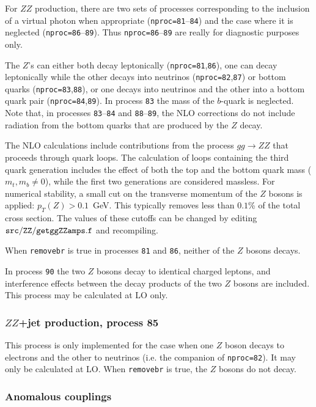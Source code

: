 \documentclass[12pt]{article}
\begin{document}
For $ZZ$ production, there are two sets of processes corresponding to the
inclusion of a virtual photon when appropriate ({\tt nproc=81}--{\tt 84})
and the case where it is neglected ({\tt nproc=86}--{\tt 89}).
Thus {\tt nproc=86}--{\tt 89} are really for diagnostic purposes only.

The $Z$'s can either both decay leptonically ({\tt nproc=81},{\tt 86}),
one can decay leptonically while the other decays into neutrinos
({\tt nproc=82},{\tt 87}) or bottom quarks ({\tt nproc=83},{\tt 88}), or
one decays into neutrinos and the other into a bottom quark pair
({\tt nproc=84},{\tt 89}).
In process {\tt 83} the mass of the $b$-quark is neglected. Note that, in processes
{\tt 83}--{\tt 84} and {\tt 88}--{\tt 89}, the NLO corrections do not include
radiation from the bottom quarks that are produced by the $Z$ decay.

The NLO calculations include contributions from the process $gg \to ZZ$
that proceeds through quark loops. The calculation of loops containing the third quark generation
includes the effect of both the top and the bottom quark mass ($m_t,m_b \neq 0$), while the first two
generations are considered massless. For numerical stability, a small cut on the
transverse momentum of the $Z$ bosons is applied: $p_T(Z)>0.1$~GeV.
This typically removes less than $0.1$\% of the total cross section. The
values of these cutoffs can be changed by editing ${\tt src/ZZ/getggZZamps.f}$ 
and recompiling.

When {\tt removebr} is true in processes {\tt 81} and {\tt 86},
neither of the $Z$ bosons decays.

In process {\tt 90} the two $Z$ bosons decay to identical charged leptons,
and interference effects between the decay products of the two $Z$ bosons
are included. This process may be calculated at LO only.

\subsubsection{$ZZ$+jet production, process 85}

This process is only implemented for the case when one $Z$ boson decays to
electrons and the other to neutrinos (i.e. the companion of {\tt nproc=82}).
It may only be calculated at LO. When {\tt removebr} is true, the $Z$ bosons
do not decay.

\subsubsection{Anomalous couplings}
\end{document}
